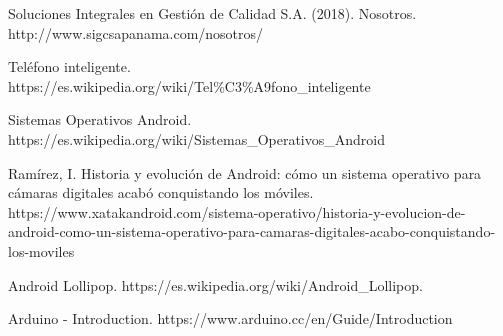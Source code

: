 \begin{thebibliography}{9}

Soluciones Integrales en Gestión de Calidad S.A. (2018). Nosotros. http://www.sigcsapanama.com/nosotros/

Teléfono inteligente.\\ https://es.wikipedia.org/wiki/Tel\%C3\%A9fono\_inteligente

Sistemas Operativos Android.\\ https://es.wikipedia.org/wiki/Sistemas\_Operativos\_Android

Ramírez, I. Historia y evolución de Android: cómo un sistema operativo para cámaras digitales acabó conquistando los móviles.  https://www.xatakandroid.com/sistema-operativo/historia-y-evolucion-de-android-como-un-sistema-operativo-para-camaras-digitales-acabo-conquistando-los-moviles

Android Lollipop. https://es.wikipedia.org/wiki/Android\_Lollipop.

Arduino - Introduction.  https://www.arduino.cc/en/Guide/Introduction 
\end{thebibliography}